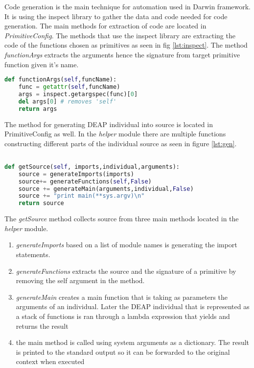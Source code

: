 Code generation is the main technique for automation used in Darwin framework. It is using
the inspect library to gather the data and code needed for code generation. The main methods
for extraction of code are located in \textit{PrimitiveConfig}. The methods that use the inspect library
are extracting the code of the functions chosen as primitives as seen in fig \ref{lst:inspect}.
The method \textit{functionArgs} extracts the arguments hence the signature from target primitive function
given it's name.

\begin{lstlisting}[language=Python,caption={Function extracting the arguments of a primitive based on it's name},label={lst:inspect}]
def functionArgs(self,funcName):
    func = getattr(self,funcName)
    args = inspect.getargspec(func)[0]
    del args[0] # removes 'self'
    return args
\end{lstlisting}

The method for generating DEAP individual into source is located in PrimitiveConfig as well. In the \textit{helper} module
there are multiple functions constructing different parts of the individual source as seen in figure \ref{lst:gen}.

\begin{lstlisting}[language=Python,caption={Function in PrimitiveConfig class that gathers source code parts of the individual},label={lst:gen}]

def getSource(self, imports,individual,arguments):
    source = generateImports(imports)
    source+= generateFunctions(self,False)
    source += generateMain(arguments,individual,False)
    source += "print main(**sys.argv)\n"
    return source
\end{lstlisting}

The \textit{getSource} method collects source from three main methods located in the \textit{helper} module.

\begin{enumerate}
\item \textit{generateImports} based on a list of module names is generating the import statements.

\item \textit{generateFunctions} extracts the source and the signature of a primitive by removing the self argument in the method. 
\item \textit{generateMain} creates a main function that is taking as parameters the arguments of an individual. Later the DEAP
individual that is represented as a stack of functions is ran through a lambda expression that yields and returns the result
\item the main method is called using system arguments as a dictionary. The result is printed to the standard output
so it can be forwarded to the original context when executed
\end{enumerate}

